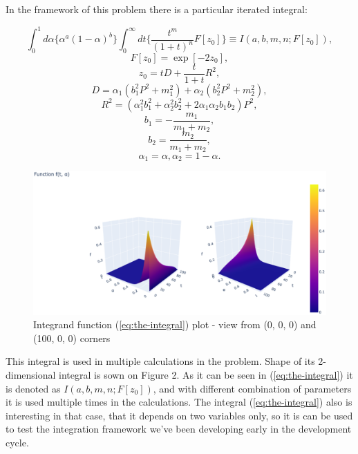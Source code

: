 \documentclass[%
]{ittmm}
\begin{document}
In the framework of this problem there is a particular iterated integral:

\begin{equation}
    \label{eq:the-integral}
    \int_{0}^{1}d\alpha\{\alpha^{a}(1 - \alpha)^b\}\int_{0}^{\infty}dt\{\frac{t^m}{(1+t)^n}F[z_{0}]\} \equiv I(a, b, m, n; F[z_{0}]),
\end{equation}
\begin{equation}   
    F[z_0] = \exp[-2z_0],
\end{equation}
\begin{equation} 
    z_0 = tD + \frac{t}{1 + t}R^2,
\end{equation}
\begin{equation}     
    D = \alpha_1(b_1^{2}P^2 + m_1^2) + \alpha_2(b_2^{2}P^2 + m_2^2),
\end{equation}
\begin{equation} 
        R^2 = (\alpha_1^{2}b_1^2 + \alpha_2^{2}b_2^2 + 2\alpha_{1}\alpha_{2}b_{1}b_2)P^2,
\end{equation}
\begin{equation} 
    b_1 = -\frac{m_1}{m_1 + m_2},
\end{equation}
\begin{equation} 
    b_2 = \frac{m_2}{m_1 + m_2},
\end{equation}
\begin{equation}
    \alpha_1 = \alpha, \alpha_2 = 1 - \alpha.
\end{equation}

\begin{figure}
    \centering
    \includegraphics[width=0.8\linewidth]{f(t,a)33.png}
    \caption{Integrand function (\ref{eq:the-integral}) plot - view from (0, 0, 0) and (100, 0, 0) corners}
    \label{fig:integrand-plot}
\end{figure}

\noindent This integral is used in multiple calculations in the problem. Shape of its 2-dimensional integral is sown on Figure 2. As it can be seen in (\ref{eq:the-integral}) it is denoted as $I(a, b, m, n; F[z_{0}])$, and with different combination of parameters it is used multiple times in the calculations. The integral (\ref{eq:the-integral}) also is interesting in that case, that it depends on two variables only, so it is can be used to test the integration framework we've been developing early in the development cycle. 
\end{document}
